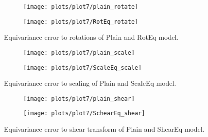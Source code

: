     \begin{figure}[h!]
    \begin{adjustwidth}{-11em}{-11em}
        \centering
        \begin{subfigure}{0.6\textwidth}
            \texttt{[image: plots/plot7/plain\_rotate]}
        \end{subfigure}
        \begin{subfigure}{0.6\textwidth}
            \texttt{[image: plots/plot7/RotEq\_rotate]}
        \end{subfigure}
    \end{adjustwidth}
        \caption{Equivariance error to rotations of Plain and RotEq
        model.}
        \label{fig:plot7rot}
    \end{figure}


    \begin{figure}[h!]
        \centering
        \begin{subfigure}{0.4\textwidth}
            \texttt{[image: plots/plot7/plain\_scale]}
        \end{subfigure}
        \begin{subfigure}{0.4\textwidth}
            \texttt{[image: plots/plot7/ScaleEq\_scale]}
        \end{subfigure}
        \caption{Equivariance error to scaling of Plain and ScaleEq
        model.}
        \label{fig:plot7scale}
    \end{figure}


    \begin{figure}[h!]
        \centering
        \begin{subfigure}{0.4\textwidth}
            \texttt{[image: plots/plot7/plain\_shear]}
        \end{subfigure}
        \begin{subfigure}{0.4\textwidth}
            \texttt{[image: plots/plot7/SchearEq\_shear]}
        \end{subfigure}
        \caption{Equivariance error to shear transform of Plain and ShearEq
        model.}
        \label{fig:plot7shear}
    \end{figure}



